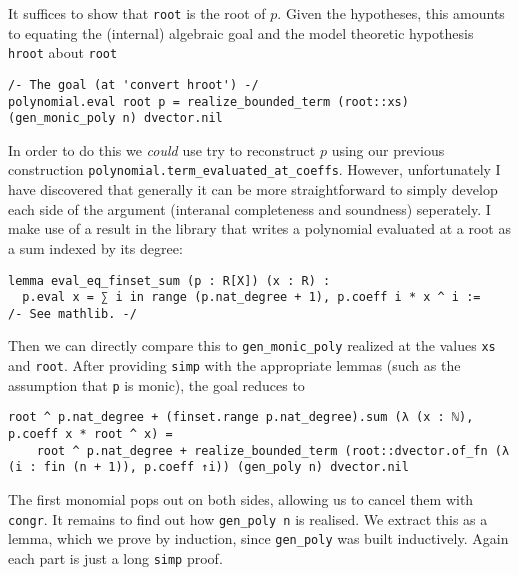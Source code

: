 It suffices to show that \texttt{root} is the root of $p$.
Given the hypotheses, this amounts to equating the (internal) algebraic goal
and the model theoretic hypothesis \texttt{hroot} about \texttt{root}

\begin{lstlisting}
/- The goal (at 'convert hroot') -/
polynomial.eval root p = realize_bounded_term (root::xs) (gen_monic_poly n) dvector.nil\end{lstlisting}

In order to do this we \textit{could} use try to reconstruct $p$
using our previous construction \texttt{polynomial.term\_evaluated\_at\_coeffs}.
However, unfortunately I have discovered that generally it can be
more straightforward to simply develop each side of the argument
(interanal completeness and soundness) seperately.
I make use of a result in the library that writes a polynomial
evaluated at a root as a sum indexed by its degree:

\begin{lstlisting}
lemma eval_eq_finset_sum (p : R[X]) (x : R) :
  p.eval x = ∑ i in range (p.nat_degree + 1), p.coeff i * x ^ i :=
/- See mathlib. -/
\end{lstlisting}

Then we can directly compare this to \texttt{gen\_monic\_poly} realized
at the values \texttt{xs} and \texttt{root}.
After providing \texttt{simp} with the appropriate lemmas
(such as the assumption that \texttt{p} is monic),
the goal reduces to

\begin{lstlisting}
root ^ p.nat_degree + (finset.range p.nat_degree).sum (λ (x : ℕ), p.coeff x * root ^ x) =
    root ^ p.nat_degree + realize_bounded_term (root::dvector.of_fn (λ (i : fin (n + 1)), p.coeff ↑i)) (gen_poly n) dvector.nil\end{lstlisting}

The first monomial pops out on both sides,
allowing us to cancel them with \texttt{congr}.
It remains to find out how \texttt{gen\_poly n} is realised.
We extract this as a lemma,
which we prove by induction, since \texttt{gen\_poly} was built inductively.
Again each part is just a long \texttt{simp} proof.

